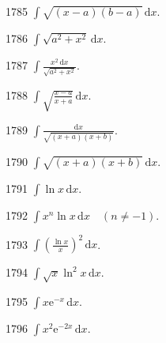 \begin{prob}[S]{1785}
$\int \sqrt{(x - a)(b - a)}\,\mathrm{d}x$.
\end{prob}


\begin{prob}[S]{1786}
$\int \sqrt{a^2 + x^2}\,\mathrm{d}x$.
\end{prob}

\begin{prob}[S]{1787}
$\int \frac{x^2\,\mathrm{d}x}{\sqrt{a^2 + x^2}}$.
\end{prob}

\begin{prob}[S]{1788}
$\int \sqrt{\frac{x - a}{x + a}}\,\mathrm{d}x$.
\end{prob}

\begin{prob}[S]{1789}
$\int \frac{\mathrm{d}x}{\sqrt{(x + a)(x + b)}}$.
\end{prob}

\begin{prob}[S]{1790}
$\int \sqrt{(x + a)(x + b)}\,\mathrm{d}x$.
\end{prob}


\begin{prob}[S]{1791}
$\int \ln x\,\mathrm{d}x$.
\end{prob}

\begin{prob}[S]{1792}
$\int x^n \ln x\,\mathrm{d}x \quad (n \neq -1)$.
\end{prob}

\begin{prob}[S]{1793}
$\int \left(\frac{\ln x}{x}\right)^2\,\mathrm{d}x$.
\end{prob}

\begin{prob}[S]{1794}
$\int \sqrt{x}\ln^2 x\,\mathrm{d}x$.
\end{prob}

\begin{prob}[S]{1795}
$\int x\mathrm{e}^{-x}\,\mathrm{d}x$.
\end{prob}

\begin{prob}[S]{1796}
$\int x^2 \mathrm{e}^{-2x}\,\mathrm{d}x$.
\end{prob}

